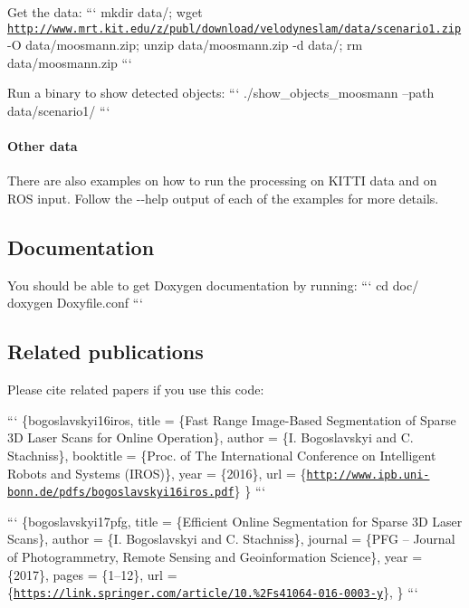 Get the data\-: ``` mkdir data/; wget \href{http://www.mrt.kit.edu/z/publ/download/velodyneslam/data/scenario1.zip}{\tt http\-://www.\-mrt.\-kit.\-edu/z/publ/download/velodyneslam/data/scenario1.\-zip} -\/\-O data/moosmann.\-zip; unzip data/moosmann.\-zip -\/d data/; rm data/moosmann.\-zip ```

Run a binary to show detected objects\-: ``` ./show\-\_\-objects\-\_\-moosmann --path data/scenario1/ ```

\paragraph*{Other data}

There are also examples on how to run the processing on K\-I\-T\-T\-I data and on R\-O\-S input. Follow the {\ttfamily -\/-\/help} output of each of the examples for more details.

\subsection*{Documentation}

You should be able to get Doxygen documentation by running\-: ``` cd doc/ doxygen Doxyfile.\-conf ```

\subsection*{Related publications}

Please cite related papers if you use this code\-:

``` \{bogoslavskyi16iros, title = \{Fast Range Image-\/\-Based Segmentation of Sparse 3\-D Laser Scans for Online Operation\}, author = \{I. Bogoslavskyi and C. Stachniss\}, booktitle = \{Proc. of The International Conference on Intelligent Robots and Systems (I\-R\-O\-S)\}, year = \{2016\}, url = \{\href{http://www.ipb.uni-bonn.de/pdfs/bogoslavskyi16iros.pdf}{\tt http\-://www.\-ipb.\-uni-\/bonn.\-de/pdfs/bogoslavskyi16iros.\-pdf}\} \} ```

``` \{bogoslavskyi17pfg, title = \{Efficient Online Segmentation for Sparse 3\-D Laser Scans\}, author = \{I. Bogoslavskyi and C. Stachniss\}, journal = \{P\-F\-G -- Journal of Photogrammetry, Remote Sensing and Geoinformation Science\}, year = \{2017\}, pages = \{1--12\}, url = \{\href{https://link.springer.com/article/10.1007%2Fs41064-016-0003-y}{\tt https\-://link.\-springer.\-com/article/10.\%2\-Fs41064-\/016-\/0003-\/y}\}, \} ``` 